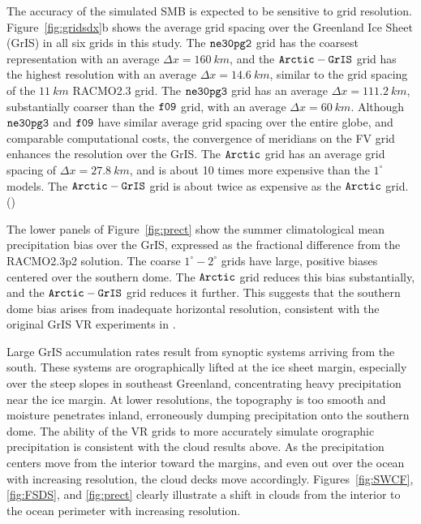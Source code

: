 \documentclass[draft]{agujournal2019}
\begin{document}
The accuracy of the simulated SMB is expected to be sensitive to grid resolution. Figure~\ref{fig:gridsdx}b shows the average grid spacing over the Greenland Ice Sheet (GrIS) in all six grids in this study. The $\tt ne30pg2$ grid has the coarsest representation with an average $\Delta x=160~km$, and the $\tt Arctic-GrIS$ grid has the highest resolution with an average $\Delta x=14.6~km$, similar to the grid spacing of the $11~km$ RACMO2.3 grid. The $\tt ne30pg3$ grid has an average $\Delta x=111.2~km$, substantially coarser than the $\tt f09$ grid, with an average $\Delta x=60~km$. Although $\tt ne30pg3$ and $\tt f09$ have similar average grid spacing over the entire globe, and comparable computational costs, the convergence of meridians on the FV grid enhances the resolution over the GrIS. The $\tt Arctic$ grid has an average grid spacing of $\Delta x=27.8~km$, and is about 10 times more expensive than the $1^{\circ}$ models.  The $\tt Arctic-GrIS$ grid is about twice as expensive as the $\tt Arctic$ grid. ({\color{blue}{Wondering if this paragraph would go better in an earlier section. Rene agrees}})

The lower panels of Figure~\ref{fig:prect} show the summer climatological mean precipitation bias over the GrIS, expressed as the fractional difference from the RACMO2.3p2 solution. The coarse $1^{\circ}-2^{\circ}$ grids have large, positive biases centered over the southern dome. The $\tt Arctic$ grid reduces this bias substantially, and the $\tt Arctic-GrIS$ grid reduces it further. This suggests that the southern dome bias arises from inadequate horizontal resolution, consistent with the original GrIS VR experiments in . 

Large GrIS accumulation rates result from synoptic systems arriving from the south. These systems are orographically lifted at the ice sheet margin, especially over the steep slopes in southeast Greenland, concentrating heavy precipitation near the ice margin. At lower resolutions, the topography is too smooth and moisture penetrates inland, erroneously dumping precipitation onto the southern dome. The ability of the VR grids to more accurately simulate orographic precipitation is consistent with the cloud results above. As the precipitation centers move from the interior toward the margins, and even out over the ocean with increasing resolution, the cloud decks move accordingly. Figures~\ref{fig:SWCF}, \ref{fig:FSDS}, and \ref{fig:prect} clearly illustrate a shift in clouds from the interior to the ocean perimeter with increasing resolution.
\end{document}
